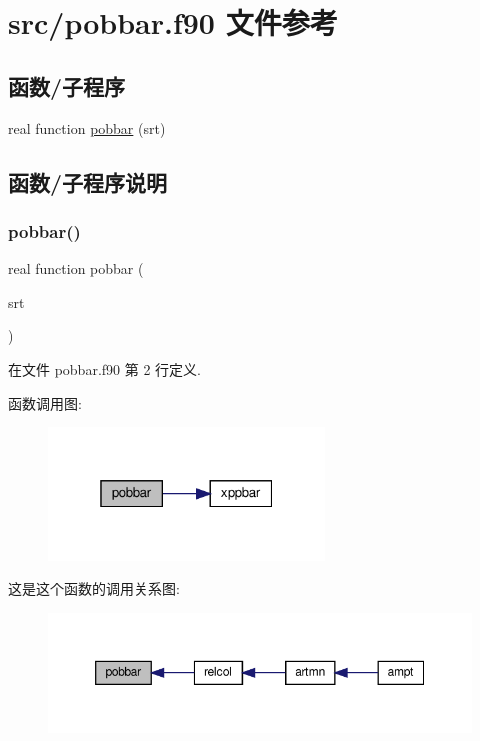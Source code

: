 \hypertarget{pobbar_8f90}{}\section{src/pobbar.f90 文件参考}
\label{pobbar_8f90}
\subsection*{函数/子程序}
\begin{DoxyCompactItemize}
\item 
real function \mbox{\hyperlink{pobbar_8f90_a4d1705206e99246933e47882e35c472e}{pobbar}} (srt)
\end{DoxyCompactItemize}


\subsection{函数/子程序说明}
\mbox{\label{pobbar_8f90_a4d1705206e99246933e47882e35c472e}} 
\subsubsection{\texorpdfstring{pobbar()}{pobbar()}}
{\footnotesize\ttfamily real function pobbar (\begin{DoxyParamCaption}\item[{}]{srt }\end{DoxyParamCaption})}



在文件 pobbar.\+f90 第 2 行定义.

函数调用图\+:
\nopagebreak
\begin{figure}[H]
\begin{center}
\leavevmode
\includegraphics[width=208pt]{pobbar_8f90_a4d1705206e99246933e47882e35c472e_cgraph}
\end{center}
\end{figure}
这是这个函数的调用关系图\+:
\nopagebreak
\begin{figure}[H]
\begin{center}
\leavevmode
\includegraphics[width=350pt]{pobbar_8f90_a4d1705206e99246933e47882e35c472e_icgraph}
\end{center}
\end{figure}
